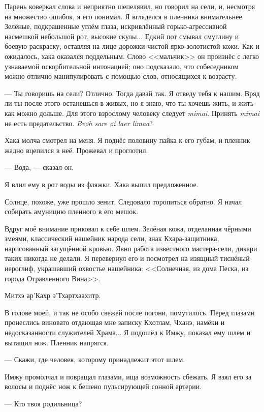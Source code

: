 Парень коверкал слова и неприятно шепелявил, но говорил на сели, и, несмотря на множество ошибок, я его понимал.
Я вгляделся в пленника внимательнее.
Зелёные, подкрашенные углём глаза, искривлённый горько-агрессивной насмешкой небольшой рот, высокие скулы...
Едкий пот смывал смуглину и боевую раскраску, оставляя на лице дорожки чистой ярко-золотистой кожи.
Как и ожидалось, хака оказался поддельным.
Слово <<мальчик>> он произнёс с легко узнаваемой оскорбительной интонацией;
оно подсказало, что собеседником можно отлично манипулировать с помощью слов, относящихся к возрасту.

--- Ты говоришь на сели?
Отлично.
Тогда давай так.
Я отведу тебя к нашим.
Вряд ли ты после этого останешься в живых, но я знаю, что ты хочешь жить, и жить как можно дольше.
Для этого взрослому человеку следует \textit{mimai}\FM.
Принять \textit{mimai} не есть предательство.
\textit{Bv\o{}h sare \o{}i laer limaa}\FM?

Хака молча смотрел на меня.
Я поднёс половину пайка к его губам, и пленник жадно вцепился в неё.
Прожевал и проглотил.

--- Вода, --- сказал он.

Я влил ему в рот воды из фляжки.
Хака выпил предложенное.

Солнце, похоже, уже прошло зенит.
Следовало торопиться обратно.
Я начал собирать амуницию пленного в его мешок.

Вдруг моё внимание приковал к себе шлем.
Зелёная кожа, отделанная чёрными змеями, классический нашейник народа сели, знак Кхара-защитника, нарисованный загущённой кровью.
Явно работа известного мастера-сели, дикари таких никогда не делали.
Я перевернул его и посмотрел на изящный тиснёный иероглиф, украшавший охвостье нашейника: <<Солнечная, из дома Песка, из города Отравленного Вина>>.

Митхэ ар’Кахр э’Тхартхаахитр.

В голове моей, и так не особо свежей после погони, помутилось.
Перед глазами пронеслись виновато отдающая мне записку Кхотлам, Чханэ, намёки и недосказанности служителей Храма...
Я подошёл к Имжу, показал ему шлем и вытащил нож.
Пленник напрягся.

--- Скажи, где человек, которому принадлежит этот шлем.

Имжу промолчал и повращал глазами, ища возможность сбежать.
Я взял его за волосы и поднёс нож к бешено пульсирующей сонной артерии.

--- Кто твоя родильница?

